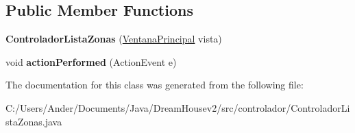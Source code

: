 \subsection*{Public Member Functions}
\begin{DoxyCompactItemize}
\item 
\mbox{\label{classcontrolador_1_1_controlador_lista_zonas_ace36c2e2e48aae483239b91ccc33d580}} 
{\bfseries Controlador\+Lista\+Zonas} (\mbox{\hyperlink{classvista_1_1_ventana_principal}{Ventana\+Principal}} vista)
\item 
\mbox{\label{classcontrolador_1_1_controlador_lista_zonas_a3daf75a60ff207317353b31ac649d147}} 
void {\bfseries action\+Performed} (Action\+Event e)
\end{DoxyCompactItemize}


The documentation for this class was generated from the following file\+:\begin{DoxyCompactItemize}
\item 
C\+:/\+Users/\+Ander/\+Documents/\+Java/\+Dream\+Housev2/src/controlador/Controlador\+Lista\+Zonas.\+java\end{DoxyCompactItemize}
